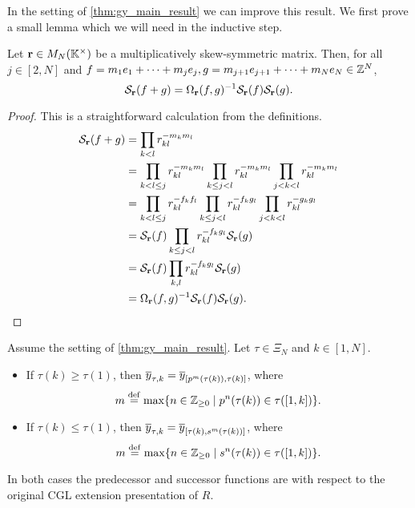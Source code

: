 In the setting of \cref{thm:gy_main_result} we can improve this result. We first prove
a small lemma which we will need in the inductive step.
\begin{lemma}\label{lem:symmetrization_of_sum}

	Let $\mathbf{r} \in M_N(\mathbb{K}^\times)$ be a multiplicatively skew-symmetric matrix. Then, for all $j \in [2, N]$ and $f = m_1 e_1 + \dots + m_j e_j, g = m_{j+1} e_{j+1} + \dots + m_{N} e_N \in \mathbb{Z}^N$,
	\begin{equation*}
		\mathcal{S}_{\mathbf{r}}(f+g) = \Omega_{\mathbf{r}}(f,g)^{-1} \mathcal{S}_{\mathbf{r}}(f)\mathcal{S}_{\mathbf{r}}(g).
	\end{equation*}
\end{lemma}
\begin{proof}
	This is a straightforward calculation from the definitions.
	\begin{align*}
		\mathcal{S}_{\mathbf{r}}(f+g)
		 & = \prod_{k < l}r_{kl}^{-m_k m_l}                                                                                 \\
		 & = \prod_{k < l \leq j}r_{kl}^{-m_k m_l} \prod_{k \leq j < l}r_{kl}^{-m_k m_l} \prod_{j < k < l}r_{kl}^{-m_k m_l} \\
		 & = \prod_{k < l \leq j}r_{kl}^{-f_k f_l} \prod_{k \leq j < l}r_{kl}^{-f_k g_l} \prod_{j < k < l}r_{kl}^{-g_k g_l} \\
		 & = \mathcal{S}_{\mathbf{r}}(f) \prod_{k \leq j < l}r_{kl}^{-f_k g_l} \mathcal{S}_{\mathbf{r}}(g)                                            \\
		 & = \mathcal{S}_{\mathbf{r}}(f) \prod_{k, l}r_{kl}^{-f_k g_l} \mathcal{S}_{\mathbf{r}}(g)                                                    \\
		 & = \Omega_{\mathbf{r}}(f,g)^{-1} \mathcal{S}_{\mathbf{r}}(f) \mathcal{S}_{\mathbf{r}}(g).
	\end{align*}
\end{proof}
\begin{proposition}\label{prop:y_tau_is_y_bracket}
	Assume the setting of \cref{thm:gy_main_result}. Let $\tau \in \Xi_N$ and $k \in [1, N]$.
	\begin{itemize}
		\item If $\tau(k) \geq \tau(1)$, then $\overline{y}_{\tau,k} = \overline{y}_{[p^m(\tau(k)), \tau(k)]}$, where
		      \begin{equation*}
			      m \overset{\mathrm{def}}{=} \max\{n \in \mathbb{Z}_{\geq 0} \mid p^n(\tau(k)) \in \tau([1,k])\}.
		      \end{equation*}
		\item If $\tau(k) \leq \tau(1)$, then $\overline{y}_{\tau,k} = \overline{y}_{[\tau(k),s^m( \tau(k))]}$, where
		      \begin{equation*}
			      m \overset{\mathrm{def}}{=} \max\{n \in \mathbb{Z}_{\geq 0} \mid s^n(\tau(k)) \in \tau([1,k])\}.
		      \end{equation*}
	\end{itemize}
	In both cases the predecessor and successor functions are with respect to the original
	CGL extension presentation of $R$.
\end{proposition}
